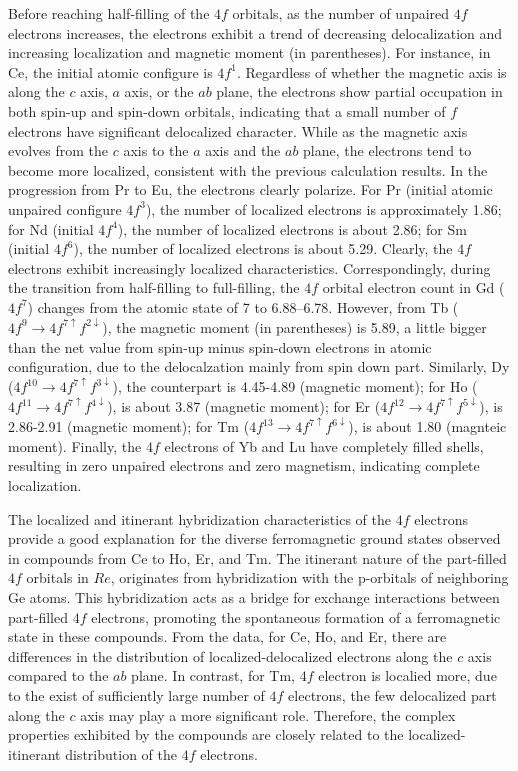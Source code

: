 \documentclass[preprint,12pt]{elsarticle}
\begin{document}
	Before reaching half-filling of the $4f$ orbitals, as the number of unpaired $4f$ electrons increases, the electrons exhibit a trend of decreasing delocalization and increasing localization and magnetic moment (in parentheses). For instance, in Ce, the initial atomic configure is $4f^1$. Regardless of whether the magnetic axis is along the $c$ axis, $a$ axis, or the $ab$ plane, the electrons show partial occupation in both spin-up and spin-down orbitals, indicating that a small number of $f$ electrons have significant delocalized character. While as the magnetic axis evolves from the $c$ axis to the $a$ axis and the $ab$ plane, the electrons tend to become more localized, consistent with the previous calculation results. In the progression from Pr to Eu, the electrons clearly polarize. For Pr (initial atomic unpaired configure $4f^3$), the number of localized electrons is approximately 1.86; for Nd (initial $4f^4$), the number of localized electrons is about 2.86; for Sm (initial $4f^6$), the number of localized electrons is about 5.29. Clearly, the $4f$ electrons exhibit increasingly localized characteristics. Correspondingly, during the transition from half-filling to full-filling, the $4f$ orbital electron count in Gd ($4f^7$) changes from the atomic state of 7 to 6.88–6.78. However, from Tb ($4f^9\rightarrow4f^{7\uparrow}f^{2\downarrow}$), the magnetic moment (in parentheses) is 5.89, a little bigger than the net value from spin-up minus spin-down electrons in atomic configuration, due to the delocalzation mainly from spin down part. Similarly, Dy ($4f^{10}\rightarrow4f^{7\uparrow}f^{3\downarrow}$), the counterpart is 4.45-4.89 (magnetic moment); for Ho ($4f^{11}\rightarrow4f^{7\uparrow}f^{4\downarrow}$), is about 3.87 (magnetic moment); for Er ($4f^{12}\rightarrow4f^{7\uparrow}f^{5\downarrow}$), is 2.86-2.91 (magnetic moment); for Tm ($4f^{13}\rightarrow4f^{7\uparrow}f^{6\downarrow}$), is about 1.80 (magnteic moment). Finally, the $4f$ electrons of Yb and Lu have completely filled shells, resulting in zero unpaired electrons and zero magnetism, indicating complete localization.

	The localized and itinerant hybridization characteristics of the $4f$ electrons provide a good explanation for the diverse ferromagnetic ground states observed in compounds from Ce to Ho, Er, and Tm. The itinerant nature of the part-filled $4f$ orbitals in $Re$, originates from hybridization with the p-orbitals of neighboring Ge atoms. This hybridization acts as a bridge for exchange interactions between part-filled $4f$ electrons, promoting the spontaneous formation of a ferromagnetic state in these compounds. From the data, for Ce, Ho, and Er, there are differences in the distribution of localized-delocalized electrons along the $c$ axis compared to the $ab$ plane. In contrast, for Tm, $4f$ electron is localied more, due to the exist of sufficiently large number of $4f$ electrons, the few delocalized part along the $c$ axis may play a more significant role. Therefore, the complex properties exhibited by the compounds are closely related to the localized-itinerant distribution of the $4f$ electrons.
\end{document}
